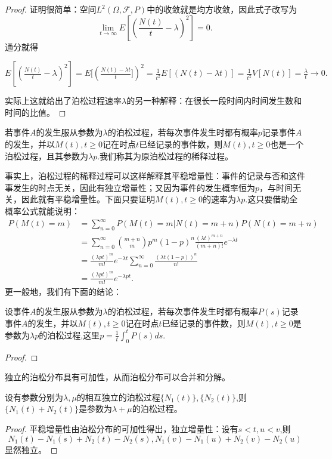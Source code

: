 \documentclass[lang=cn,10pt]{elegantbook}
\begin{document}
	\begin{proof}
		证明很简单：空间\(L^2(\Omega,\mathcal{F},P)\)中的收敛就是均方收敛，因此式子改写为
		\[\lim_{t \to \infty}E[(\frac{N(t)}{t}-\lambda)^2]=0.\]
		通分就得

		\(E[(\frac{N(t)}{t}-\lambda)^2]=E[(\frac{N(t)-\lambda t}{t}])^2=\frac{1}{t^2}E[(N(t)-\lambda t)]=\frac{1}{t^2}V[N(t)]=\frac{\lambda}{t}\to 0.\)

		实际上这就给出了泊松过程速率\(\lambda\)的另一种解释：在很长一段时间内时间发生数和时间的比值。
	\end{proof}


	若事件\(A\)的发生服从参数为\(\lambda\)的泊松过程，若每次事件发生时都有概率\(p\)记录事件\(A\)的发生，并以\(M(t),t\ge 0\)记在时点\(t\)已经记录的事件数，则\(M(t),t\ge 0\)也是一个泊松过程，且其参数为\(\lambda p\).我们称其为原泊松过程的稀释过程。

	事实上，泊松过程的稀释过程可以这样解释其平稳增量性：事件的记录与否和这件事发生的时点无关，因此有独立增量性；又因为事件的发生概率恒为\(p\)，与时间无关，因此就有平稳增量性。下面只要证明\(M(t),t\ge 0\)的速率为\(\lambda p\).这只要借助全概率公式就能说明：
	\begin{align*}
		P(M(t)=m)&=\sum_{n=0}^{\infty}P(M(t)=m|N(t)=m+n)P(N(t)=m+n)\\
		&=\sum_{n=0}^{\infty}\binom{m+n}{m}p^m(1-p)^n\frac{(\lambda t)^{m+n}}{(m+n)!}e^{-\lambda t}\\
		&=\frac{(\lambda pt)^m}{m!}e^{-\lambda t}\sum_{n=0}^{\infty}\frac{(\lambda t(1-p))^n}{n!}\\
		&=\frac{(\lambda pt)^m}{m!}e^{-\lambda pt}.
	\end{align*}
	更一般地，我们有下面的结论：
	\begin{theorem}[泊松过程的稀释过程]
		设事件\(A\)的发生服从参数为\(\lambda\)的泊松过程，若每次事件发生时都有概率\(P(s)\)记录事件\(A\)的发生，并以\(M(t),t\ge 0\)记在时点\(t\)已经记录的事件数，则\(M(t),t\ge 0\)是参数为\(\lambda p\)的泊松过程,这里\(p=\frac{1}{t}\int_{0}^{t}P(s)ds\).
	\end{theorem}
	\begin{proof}
		
	\end{proof}

	独立的泊松分布具有可加性，从而泊松分布可以合并和分解。
	\begin{theorem}[泊松过程的合并]
		设有参数分别为\(\lambda,\mu\)的相互独立的泊松过程\(\{N_1(t)\},\{N_2(t)\}\),则\(\{N_1(t)+N_2(t)\}\)是参数为\(\lambda+\mu\)的泊松过程。
	\end{theorem}
	\begin{proof}
		平稳增量性由泊松分布的可加性得出，独立增量性：设有\(s<t,u<v\),则
		\[N_1(t)-N_1(s)+N_2(t)-N_2(s),N_1(v)-N_1(u)+N_2(v)-N_2(u)\]
		显然独立。
	\end{proof}
\end{document}
